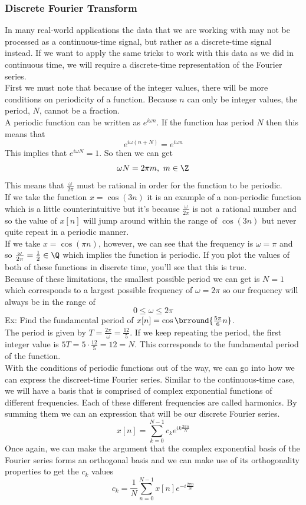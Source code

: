 \subsubsection{Discrete Fourier Transform}
In many real-world applications the data that we are working with may not be processed as a continuous-time signal, but rather as a discrete-time signal instead. If we want to apply the same tricks to work with this data as we did in continuous time, we will require a discrete-time representation of the Fourier series.\\
First we must note that because of the integer values, there will be more conditions on periodicity of a function. Because $n$ can only be integer values, the period, $N$, cannot be a fraction.\\
A periodic function can be written as $e^{i\omega n}$. If the function has period $N$ then this means that
\[ e^{i\omega (n+N)}=e^{i\omega n} \]
This implies that $e^{i\omega N}=1$. So then we can get
\[ \omega N=2\pi m,\ m\in\Z \]
This means that $\frac{\omega}{2\pi}$ must be rational in order for the function to be periodic.\\
If we take the function $x=\cos(3n)$ it is an example of a non-periodic function which is a little counterintuitive but it's because $\frac{\omega}{2\pi}$ is not a rational number and so the value of $x[n]$ will jump around within the range of $\cos(3n)$ but never quite repeat in a periodic manner.\\
If we take $x=\cos(\pi n)$, however, we can see that the frequency is $\omega=\pi$ and so $\frac{\omega}{2\pi}=\frac{1}{2}\in\Q$ which implies the function is periodic. If you plot the values of both of these functions in discrete time, you'll see that this is true.\\
Because of these limitations, the smallest possible period we can get is $N=1$ which corresponds to a largest possible frequency of $\omega=2\pi$ so our frequency will always be in the range of
$$0\leq\omega\leq 2\pi$$
Ex: Find the fundamental period of $x[n]=\cos\brround{\frac{5\pi}{6}n}$.\\
The period is given by $T=\frac{2\pi}{\omega}=\frac{12}{5}$. If we keep repeating the period, the first integer value is $5T=5\cdot\frac{12}{5}=12=N$. This corresponds to the fundamental period of the function.\\

With the conditions of periodic functions out of the way, we can go into how we can express the discreet-time Fourier series. Similar to the continuous-time case, we will have a basis that is comprised of complex exponential functions of different frequencies. Each of these different frequencies are called harmonics. By summing them we can an expression that will be our discrete Fourier series.
$$\boxed{x[n]=\sum_{k=0}^{N-1}c_ke^{ik\frac{2\pi n}{N}}}$$
Once again, we can make the argument that the complex exponential basis of the Fourier series forms an orthogonal basis and we can make use of its orthogonality properties to get the $c_k$ values
$$\boxed{c_k=\frac{1}{N}\sum_{n=0}^{N-1}x[n]e^{-i\frac{2\pi n}{N}}}$$

